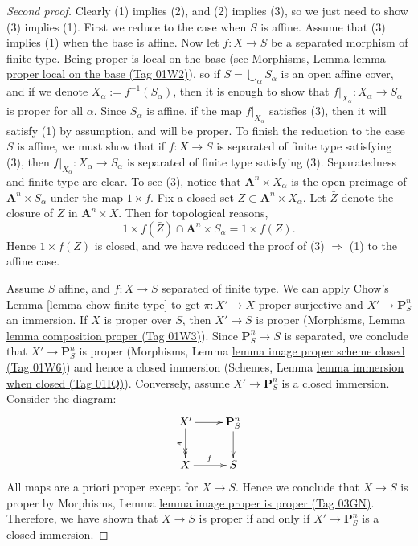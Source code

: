 \documentclass{amsart}
\theoremstyle{plain}
\theoremstyle{definition}
\theoremstyle{remark}
\numberwithin{equation}{subsection}
\begin{document}
\begin{proof}[Second proof]
Clearly (1) implies (2), and (2) implies (3), so we just need to show (3)
implies (1).
First we reduce to the case when $S$ is affine.  Assume that (3) implies (1)
when the base is affine.  Now let $f: X \to S$ be a separated morphism of
finite type.  Being proper is local on the base
(see Morphisms, Lemma \href{https://stacks.math.columbia.edu/tag/01W2}{lemma proper local on the base (Tag 01W2)}), so if
$S = \bigcup_\alpha S_\alpha$ is an open affine cover, and if
we denote $X_\alpha := f^{-1}(S_\alpha)$, then it is
enough to show that $f|_{X_\alpha}: X_\alpha \to S_\alpha$ is proper
for all $\alpha$.  Since $S_\alpha$ is affine, if
the map $f|_{X_\alpha}$ satisfies (3), then it will satisfy (1)
by assumption, and will be proper.  To finish the reduction to the
case $S$ is affine, we must show that if $f: X \to S$ is separated of
finite type satisfying (3), then $f|_{X_\alpha} : X_\alpha \to S_\alpha$
is separated of finite type satisfying (3).  Separatedness and finite
type are clear.  To see (3), notice that
$\mathbf{A}^n \times X_\alpha$ is the open preimage of
$\mathbf{A}^n \times S_\alpha$ under the map $1 \times f$.  Fix a closed
set $Z \subset \mathbf A^n \times X_\alpha$.  Let $\bar Z$ denote the
closure of $Z$ in $\mathbf{A}^n \times X$.  Then for topological
reasons,
$$
1 \times f(\bar Z) \cap \mathbf{A}^n \times S_\alpha  = 1 \times f(Z).
$$
Hence $1 \times f(Z)$ is closed, and we have reduced the proof of
(3) $\Rightarrow$ (1) to the affine case.

\medskip\noindent
Assume $S$ affine, and $f : X \to S$ separated of finite type.
We can apply Chow's Lemma \ref{lemma-chow-finite-type}
to get $\pi : X' \to X$ proper surjective and $X' \to \mathbf{P}^n_S$
an immersion. If $X$ is proper over $S$, then $X' \to S$ is proper
(Morphisms, Lemma \href{https://stacks.math.columbia.edu/tag/01W3}{lemma composition proper (Tag 01W3)}). Since
$\mathbf{P}^n_S \to S$ is separated, we conclude that $X' \to
\mathbf{P}^n_S$ is proper
(Morphisms, Lemma \href{https://stacks.math.columbia.edu/tag/01W6}{lemma image proper scheme closed (Tag 01W6)})
and hence a closed immersion
(Schemes, Lemma \href{https://stacks.math.columbia.edu/tag/01IQ}{lemma immersion when closed (Tag 01IQ)}).
Conversely, assume $X' \to \mathbf{P}^n_S$ is a closed immersion.
Consider the diagram:
\begin{equation}
\label{equation-check-proper}
\xymatrix{
X' \ar[r] \ar@{->>}[d]_{\pi} &
\mathbf{P}^n_S \ar[d] \\
X \ar[r]^f & S
}
\end{equation}
All maps are a priori proper except for $X \to S$.
Hence we conclude that $X \to S$ is proper by
Morphisms, Lemma \href{https://stacks.math.columbia.edu/tag/03GN}{lemma image proper is proper (Tag 03GN)}.
Therefore, we have shown that $X \to S$ is proper if and only if
$X' \to \mathbf{P}^n_S$ is a closed immersion.


\end{proof}
\end{document}
